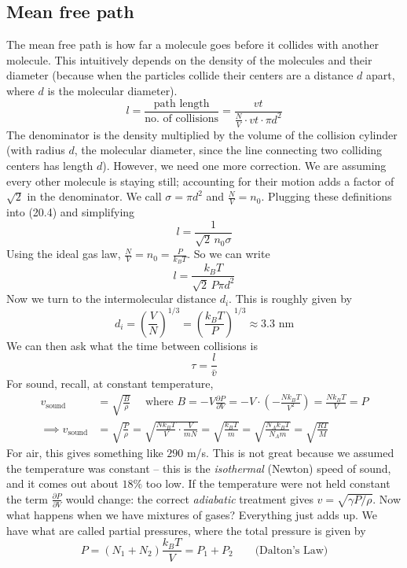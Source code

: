 \documentclass{report}
\numberwithin{equation}{section}
\newcommand{\pd}[2]{\frac{\partial #1}{\partial #2}}
\begin{document}
\subsection{Mean free path}
The mean free path is how far a molecule goes before it collides with another molecule. This intuitively depends on the density of the molecules and their diameter (because when the particles collide their centers are a distance $d$ apart, where $d$ is the molecular diameter).
\begin{equation}
    l = \frac{\text{path length}}{\text{no. of collisions}} = \frac{vt}{\frac{N}{V}\cdot vt\cdot\pi d^2}
\end{equation}
The denominator is the density multiplied by the volume of the collision cylinder (with radius $d$, the molecular diameter, since the line connecting two colliding centers has length $d$). However, we need one more correction. We are assuming every other molecule is staying still; accounting for their motion adds a factor of $\sqrt{2}$ in the denominator.
We call $\sigma = \pi d^2$ and $\frac{N}{V} = n_0$. Plugging these definitions into (20.4) and simplifying
\begin{equation}
    l = \frac{1}{\sqrt{2}\,n_0\sigma}
\end{equation}
Using the ideal gas law, $\frac{N}{V} = n_0 = \frac{P}{k_BT}$. So we can write
\begin{equation}
    l = \frac{k_BT}{\sqrt{2}\,P\pi d^2}
\end{equation}
Now we turn to the intermolecular distance $d_i$. This is roughly given by
\begin{equation}
    d_i =\left(\frac{V}{N}\right)^{1/3} = \left(\frac{k_BT}{P}\right)^{1/3} \approx 3.3\text{ nm}
\end{equation}
We can then ask what the time between collisions is
\begin{equation}
    \tau = \frac{l}{\bar v}
\end{equation}
For sound, recall, at constant temperature,
\begin{align*}
    v_{\text{sound}} &= \sqrt{\frac{B}{\rho}}\quad \text{ where } B = -V\pd{P}{V} = -V\cdot\left(-\frac{Nk_BT}{V^2}\right) = \frac{Nk_BT}{V} = P\\
    \implies v_{\text{sound}} &= \sqrt{\frac{P}{\rho}} = \sqrt{\frac{Nk_BT}{V}\cdot\frac{V}{mN}} = \sqrt{\frac{k_BT}{m}} = \sqrt{\frac{N_Ak_BT}{N_Am}} = \sqrt{\frac{RT}{M}}
\end{align*}
For air, this gives something like $290$ m/s. This is not great because we assumed the temperature was constant -- this is the \emph{isothermal} (Newton) speed of sound, and it comes out about $18\%$ too low. If the temperature were not held constant the term $\pd{P}{V}$ would change: the correct \emph{adiabatic} treatment gives $v = \sqrt{\gamma P/\rho}$. Now what happens when we have mixtures of gases? Everything just adds up. We have what are called partial pressures, where the total pressure is given by
\begin{equation}
    P = (N_1 + N_2)\frac{k_BT}{V} = P_1 + P_2 \qquad \text{(Dalton's Law)}
\end{equation}
\end{document}
